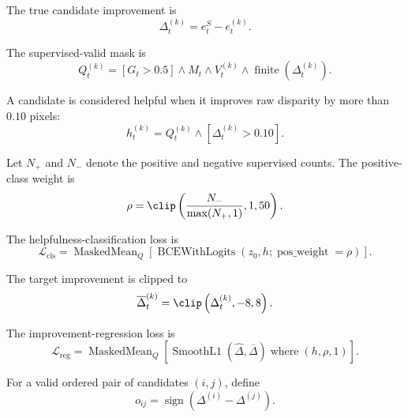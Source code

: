 \documentclass[11pt,a4paper]{article}
\begin{document}
The true candidate improvement is
%
\begin{equation}
\Delta_t^{(k)}
=
e_t^S-e_t^{(k)}.
\label{eq:true_candidate_improvement}
\end{equation}

The supervised-valid mask is
%
\begin{equation}
Q_t^{(k)}
=
\left[
G_t>0.5
\right]
\land
M_t
\land
V_t^{(k)}
\land
\operatorname{finite}
\left(
\Delta_t^{(k)}
\right).
\label{eq:training_validity}
\end{equation}

A candidate is considered helpful when it improves raw disparity by more
than \(0.10\) pixels:
%
\begin{equation}
h_t^{(k)}
=
Q_t^{(k)}
\land
\left[
\Delta_t^{(k)}>0.10
\right].
\label{eq:helpful_target}
\end{equation}

Let \(N_+\) and \(N_-\) denote the positive and negative supervised
counts. The positive-class weight is
%
\begin{equation}
\rho
=
\clip
\left(
\frac{N_-}{\max(N_+,1)},
1,
50
\right).
\label{eq:positive_class_weight}
\end{equation}

The helpfulness-classification loss is
%
\begin{equation}
\mathcal{L}_{\mathrm{cls}}
=
\operatorname{MaskedMean}_{Q}
\left[
\operatorname{BCEWithLogits}
\left(
z_0,
h;
\operatorname{pos\_weight}=\rho
\right)
\right].
\label{eq:classification_loss}
\end{equation}

The target improvement is clipped to
%
\begin{equation}
\overline{\Delta}_t^{(k)}
=
\clip
\left(
\Delta_t^{(k)},
-8,
8
\right).
\end{equation}

The improvement-regression loss is
%
\begin{equation}
\mathcal{L}_{\mathrm{reg}}
=
\operatorname{MaskedMean}_{Q}
\left[
\operatorname{SmoothL1}
\left(
\widehat{\Delta},
\overline{\Delta}
\right)
\operatorname{where}
\left(
h,
\rho,
1
\right)
\right].
\label{eq:regression_loss}
\end{equation}

For a valid ordered pair of candidates \((i,j)\), define
%
\begin{equation}
o_{ij}
=
\operatorname{sign}
\left(
\Delta^{(i)}-\Delta^{(j)}
\right).
\end{equation}
\end{document}
